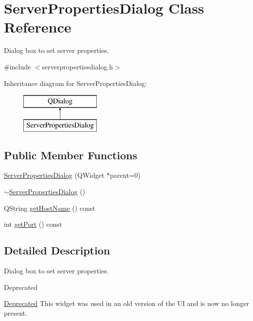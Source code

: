\hypertarget{classServerPropertiesDialog}{\section{Server\-Properties\-Dialog Class Reference}
\label{classServerPropertiesDialog}
}


Dialog box to set server properties.  




{\ttfamily \#include $<$serverpropertiesdialog.\-h$>$}

Inheritance diagram for Server\-Properties\-Dialog\-:\begin{figure}[H]
\begin{center}
\leavevmode
\includegraphics[height=2.000000cm]{classServerPropertiesDialog}
\end{center}
\end{figure}
\subsection*{Public Member Functions}
\begin{DoxyCompactItemize}
\item 
\hyperlink{classServerPropertiesDialog_aedeacbc38d85372d3fc543ca4537ed72}{Server\-Properties\-Dialog} (Q\-Widget $\ast$parent=0)
\item 
\hyperlink{classServerPropertiesDialog_abbf1b205ce936945c54ef51bf638ff07}{$\sim$\-Server\-Properties\-Dialog} ()
\item 
Q\-String \hyperlink{classServerPropertiesDialog_ae2fe6ffc4e0c04a9043a14a96f6aa5e9}{get\-Host\-Name} () const 
\item 
int \hyperlink{classServerPropertiesDialog_a00869f1fe5e8418017acfa6f351020d1}{get\-Port} () const 
\end{DoxyCompactItemize}


\subsection{Detailed Description}
Dialog box to set server properties. 

\begin{DoxyRefDesc}{Deprecated}
\item[\hyperlink{deprecated__deprecated000001}{Deprecated}]This widget was used in an old version of the U\-I and is now no longer present. \end{DoxyRefDesc}


